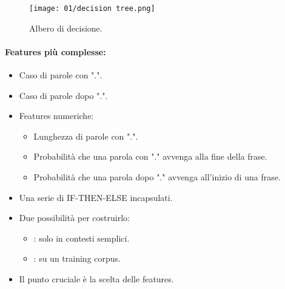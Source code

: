 \begin{figure}[h]
    \centering
    \texttt{[image: 01/decision tree.png]}
    \caption{Albero di decisione.}
\end{figure}

\paragraph{Features più complesse:}

\begin{itemize}
  \item Caso di parole con ".".
  \item Caso di parole dopo ".". 
  \item Features numeriche: 
    \begin{itemize}
      \item Lunghezza di parole con ".". 
      \item Probabilità che una parola con "." avvenga alla fine della frase. 
      \item Probabilità che una parola dopo "." avvenga all'inizio di una frase.
    \end{itemize}
\end{itemize}


\begin{itemize}
  \item Una serie di IF-THEN-ELSE incapsulati. 
  \item Due possibilità per costruirlo: 
    \begin{itemize}
      \item {}: solo in contesti semplici. 
      \item {}: su un training corpus.
    \end{itemize}
  \item Il punto cruciale è la scelta delle features.
\end{itemize}


